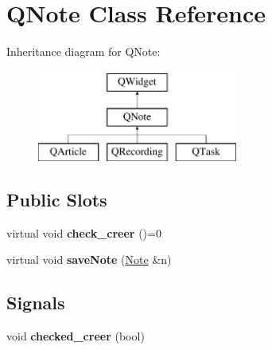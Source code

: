 \hypertarget{class_q_note}{}\section{Q\+Note Class Reference}
\label{class_q_note}
Inheritance diagram for Q\+Note\+:\begin{figure}[H]
\begin{center}
\leavevmode
\includegraphics[height=3.000000cm]{class_q_note}
\end{center}
\end{figure}
\subsection*{Public Slots}
\begin{DoxyCompactItemize}
\item 
\mbox{\label{class_q_note_a2c59bd1dee880b825b692204adea842b}} 
virtual void {\bfseries check\+\_\+creer} ()=0
\item 
\mbox{\label{class_q_note_a577f684ef199a17dc468d706b1383581}} 
virtual void {\bfseries save\+Note} (\hyperlink{class_note}{Note} \&n)
\end{DoxyCompactItemize}
\subsection*{Signals}
\begin{DoxyCompactItemize}
\item 
\mbox{\label{class_q_note_ac16104445934f4b13c7f20f268a90304}} 
void {\bfseries checked\+\_\+creer} (bool)
\end{DoxyCompactItemize}
